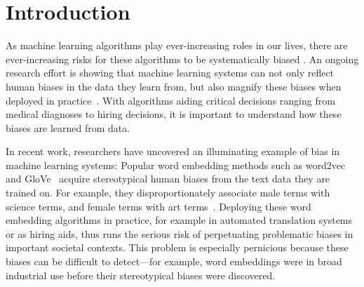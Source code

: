 \documentclass{article}
\begin{document}
\begin{abstract}
Popular word embedding algorithms exhibit stereotypical biases, such as gender bias.
The widespread use of these algorithms in machine learning systems can thus amplify stereotypes in important contexts.
Although some methods have been developed to mitigate this problem, how word embedding biases arise during training is poorly understood.
In this work, we develop a technique to address this question. Given a word embedding, our method reveals how perturbing the training corpus would affect the resulting embedding bias.
By tracing the origins of word embedding bias back to the original training documents, one can identify subsets of documents whose removal would most reduce bias.
We demonstrate our methodology on Wikipedia and New York Times corpora, and find it to be very accurate.
\end{abstract}


\section{Introduction}
As machine learning algorithms play ever-increasing roles in our lives, there are ever-increasing risks for these algorithms to be systematically biased \cite{Coref, shopping, kleinbergfairness, dworkfairness, hardtequality}. An ongoing research effort is showing that machine learning systems can not only reflect human biases in the data they learn from, but also magnify these biases when deployed in practice~\cite{sweeney2013discrimination}. With algorithms aiding critical decisions ranging from medical diagnoses to hiring decisions, it is important to understand how these biases are learned from data.

In recent work, researchers have uncovered an illuminating example of bias in machine learning systems: Popular word embedding methods such as word2vec~\cite{Word2Vec} and GloVe~\cite{GloVe} acquire stereotypical human biases from the text data they are trained on. For example, they disproportionately associate male terms with science terms, and female terms with art terms~\cite{MachineBias,WEAT}. Deploying these word embedding algorithms in practice, for example in automated translation systems or as hiring aids, thus runs the serious risk of perpetuating problematic biases in important societal contexts. This problem is especially pernicious because these biases can be difficult to detect---for example, word embeddings were in broad industrial use before their stereotypical biases were discovered.
\end{document}
